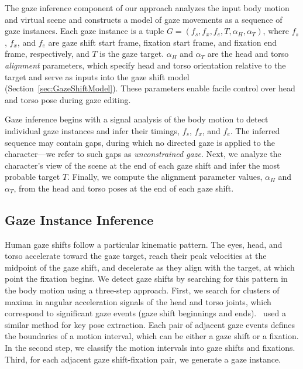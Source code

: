 The gaze inference component of our approach analyzes the input body motion and virtual scene and constructs a model of gaze movements as a sequence of gaze instances. Each gaze instance is a tuple $G = (f_s, f_x, f_e, T, \alpha_{H}, \alpha_{T})$, where $f_s$, $f_x$, and $f_e$ are gaze shift start frame, fixation start frame, and fixation end frame, respectively, and $T$ is the gaze target. $\alpha_{H}$ and $\alpha_{T}$ are the head and  torso \emph{alignment} parameters, which specify head and torso orientation relative to the target and serve as inputs into the gaze shift model (Section~\ref{sec:GazeShiftModel}). These parameters enable facile control over head and torso pose during gaze editing.

Gaze inference begins with a signal analysis of the body motion to detect individual gaze instances and infer their timings, $f_s$, $f_x$, and $f_e$. The inferred sequence may contain gaps, during which no directed gaze is applied to the character---we refer to such gaps as \emph{unconstrained gaze}. Next, we analyze the character's view of the scene at the end of each gaze shift and infer the most probable target $T$. Finally, we compute the alignment parameter values, $\alpha_{H}$ and $\alpha_{T}$, from the head and torso poses at the end of each gaze shift.

\subsection{Gaze Instance Inference}
\label{sec:GazeTimingInference}

Human gaze shifts follow a particular kinematic pattern. The eyes, head, and torso accelerate toward the gaze target, reach their peak velocities at the midpoint of the gaze shift, and decelerate as they align with the target, at which point the fixation begins. We detect gaze shifts by searching for this pattern in the body motion using a three-step approach. First, we search for clusters of maxima in angular acceleration signals of the head and torso joints, which correspond to significant gaze events (gaze shift beginnings and ends).~\citet{coleman2008staggered} used a similar method for key pose extraction. Each pair of adjacent gaze events defines the boundaries of a motion interval, which can be either a gaze shift or a fixation. In the second step, we classify the motion intervals into gaze shifts and fixations. Third, for each adjacent gaze shift-fixation pair, we generate a gaze instance.

